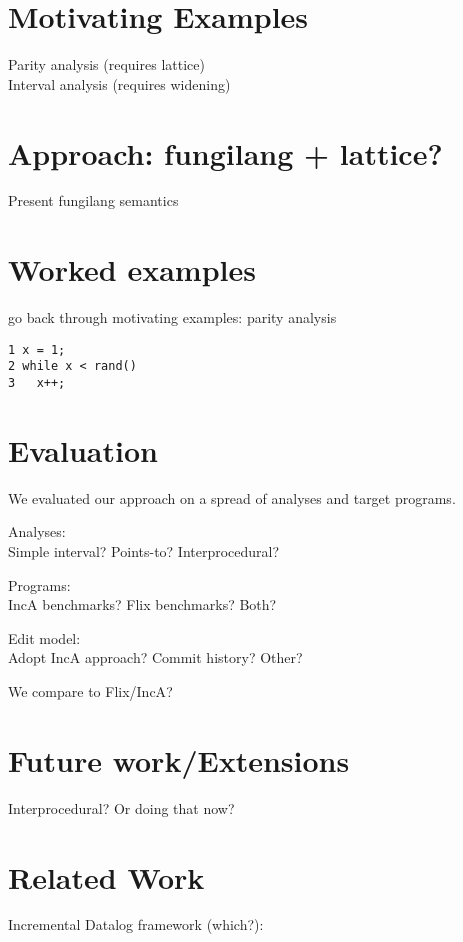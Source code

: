 \documentclass[acmlarge,anonymous]{acmart}\settopmatter{printfolios=true}
\begin{document}
\section{Motivating Examples}

Parity analysis (requires lattice)\\
Interval analysis (requires widening)

\section{Approach: fungilang + lattice?}

Present fungilang semantics

\section{Worked examples}

go back through motivating examples: parity analysis

\begin{lstlisting}
1 x = 1;
2 while x < rand()
3   x++;
\end{lstlisting}

\section{Evaluation}

We evaluated our approach on a spread of analyses and target programs.

Analyses:\\
Simple interval? Points-to? Interprocedural?

Programs:\\
IncA benchmarks? Flix benchmarks? Both?

Edit model:\\
Adopt IncA approach? Commit history? Other?

We compare to {Flix/IncA}?

\section{Future work/Extensions}

Interprocedural? Or doing that now?

\section{Related Work}

Incremental Datalog framework (which?):
\end{document}
